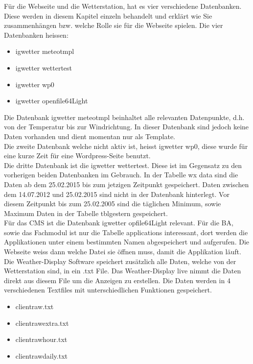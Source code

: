Für die Webseite und die Wetterstation, hat es vier verschiedene Datenbanken. Diese werden in diesem Kapitel einzeln behandelt und erklärt wie Sie zusammenhängen bzw. welche Rolle sie für die Webseite spielen. Die vier Datenbanken heissen:
\begin{itemize}  
\item igwetter meteotmpl
\item igwetter wettertest
\item igwetter wp0
\item igwetter openfile64Light
\end{itemize}

Die Datenbank igwetter meteotmpl beinhaltet alle relevanten Datenpunkte, d.h. von der Temperatur bis zur Windrichtung. In dieser Datenbank sind jedoch keine Daten vorhanden und dient momentan nur als Template.\\
Die zweite Datenbank welche nicht aktiv ist, heisst igwetter wp0, diese wurde für eine kurze Zeit für eine Wordpress-Seite benutzt.\\


Die dritte Datenbank ist die igwetter wettertest. Diese ist im Gegensatz zu den vorherigen beiden Datenbanken im Gebrauch. In der Tabelle wx data sind die Daten ab dem 25.02.2015 bis zum jetzigen Zeitpunkt gespeichert. Daten zwischen dem 14.07.2012 und 25.02.2015 sind nicht in der Datenbank hinterlegt. Vor diesem Zeitpunkt bis zum 25.02.2005 sind die täglichen Minimum, sowie Maximum Daten in der Tabelle tblgestern gespeichert. \\
Für das CMS ist die Datenbank igwetter opfile64Light relevant. Für die BA, sowie das Fachmodul ist nur die Tabelle applications interessant, dort werden die Applikationen unter einem bestimmten Namen abgespeichert und aufgerufen. Die Webseite weiss dann welche Datei sie öffnen muss, damit die Applikation läuft.\\




Die Weather-Display Software speichert zusätzlich alle Daten, welche von der Wetterstation sind, in ein .txt File. Das Weather-Display live nimmt die Daten direkt aus diesem File um die Anzeigen zu erstellen. Die Daten werden in 4 verschiedenen Textfiles mit unterschiedlichen Funktionen gespeichert.
\begin{itemize}  
\item clientraw.txt
\item clientrawextra.txt
\item clientrawhour.txt
\item clientrawdaily.txt
\end{itemize}


